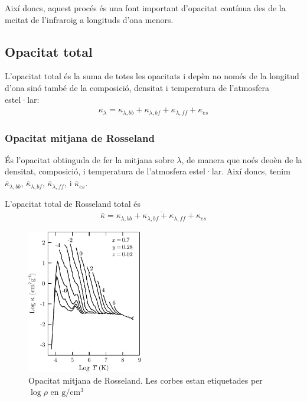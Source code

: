 Així doncs, aquest procés és una font important d'opacitat contínua des de la meitat de l'infraroig a longituds d'ona menors.

\subsection{Opacitat total}
L'opacitat total és la suma de totes les opacitats i depèn no només de la longitud d'ona sinó també de la composició, densitat i temperatura de l'atmosfera estel·lar:
\begin{align}
	\kappa_{\lambda} = \kappa_{\lambda, bb} + \kappa_{\lambda, bf} + \kappa_{\lambda, ff} + \kappa_{es}
\end{align}

\subsubsection*{Opacitat mitjana de Rosseland}
És l'opacitat obtinguda de fer la mitjana sobre $\lambda$, de manera que noés deoèn de la densitat, composició, i temperatura de l'atmosfera estel·lar. Així doncs, tenim $\bar{\kappa}_{\lambda, bb}$, $\bar{\kappa}_{\lambda, bf}$, $\bar{\kappa}_{\lambda, ff}$, i $\bar{\kappa}_{es}$.

L'opacitat total de Rosseland total és
\begin{align}
	\bar{\kappa} = \overline{\kappa_{\lambda, bb} + \kappa_{\lambda, bf} + \kappa_{\lambda, ff} + \kappa_{es}}
\end{align}
\begin{figure}[h]
	\centering
	\includegraphics[width=0.45\textwidth]{./images/4-opacitat-rosseland}
	\caption{Opacitat mitjana de Rosseland. Les corbes estan etiquetades per $\log \rho$ en $\si{\g \per \cubic\cm}$}
	\label{fig:opacitat-rosseland}
\end{figure}

